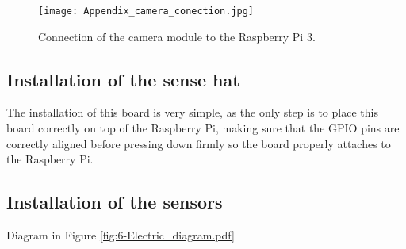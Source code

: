 \begin{figure}[!h]
	\begin{center}
		\texttt{[image: Appendix\_camera\_conection.jpg]}
		\caption{Connection of the camera module to the Raspberry Pi 3.}
		\label{fig:Appendix_camera_conection}
	\end{center}
\end{figure} %


\subsection{Installation of the sense hat}
The installation of this board is very simple, as the only step is to place this board correctly on top of the Raspberry Pi, making sure that the GPIO pins are correctly aligned before pressing down firmly so the board properly attaches to the Raspberry Pi.

\subsection{Installation of the sensors}
Diagram in Figure \ref{fig:6-Electric_diagram.pdf}


